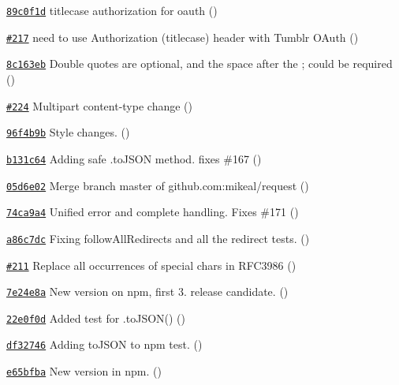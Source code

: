 \begin{DoxyItemize}
\item \href{https://github.com/mikeal/request/commit/89c0f1dd324bc65ad9c07436fb2c8220de388c42}{\tt 89c0f1d} titlecase authorization for oauth ()
\item \href{https://github.com/mikeal/request/pull/217}{\tt \#217} need to use Authorization (titlecase) header with Tumblr O\+Auth ()
\item \href{https://github.com/mikeal/request/commit/8c163eb9349459839fc720658979d5c97a955825}{\tt 8c163eb} Double quotes are optional, and the space after the ; could be required ()
\item \href{https://github.com/mikeal/request/pull/224}{\tt \#224} Multipart content-\/type change ()
\item \href{https://github.com/mikeal/request/commit/96f4b9b1f7b937a92f3f94f10d6d02f8878b6107}{\tt 96f4b9b} Style changes. ()
\item \href{https://github.com/mikeal/request/commit/b131c64816f621cf15f8c51e76eb105778b4aad8}{\tt b131c64} Adding safe .to\+J\+S\+O\+N method. fixes \#167 ()
\item \href{https://github.com/mikeal/request/commit/05d6e02c31ec4e6fcfadbfbe5414e701710f6e55}{\tt 05d6e02} Merge branch \textquotesingle{}master\textquotesingle{} of github.\+com\+:mikeal/request ()
\item \href{https://github.com/mikeal/request/commit/74ca9a4852b666d30dd71421e8cc8b8a83177148}{\tt 74ca9a4} Unified error and complete handling. Fixes \#171 ()
\item \href{https://github.com/mikeal/request/commit/a86c7dc7d0a7c640c7def4c0215e46e76a11ff56}{\tt a86c7dc} Fixing follow\+All\+Redirects and all the redirect tests. ()
\item \href{https://github.com/mikeal/request/pull/211}{\tt \#211} Replace all occurrences of special chars in R\+F\+C3986 ()
\item \href{https://github.com/mikeal/request/commit/7e24e8a48d0dcfe10d0cc08b3c4e9627b9a95a97}{\tt 7e24e8a} New version on npm, first 3. release candidate. ()
\item \href{https://github.com/mikeal/request/commit/22e0f0d73459c11b81b0f66a2cde85492dd8e38f}{\tt 22e0f0d} Added test for .to\+J\+S\+O\+N() ()
\item \href{https://github.com/mikeal/request/commit/df32746f157948b6ae05e87a35cf1768e065ef0b}{\tt df32746} Adding to\+J\+S\+O\+N to npm test. ()
\item \href{https://github.com/mikeal/request/commit/e65bfba98f0886a059a268dcdceabf41aec1e5cc}{\tt e65bfba} New version in npm. ()

\end{DoxyItemize}
